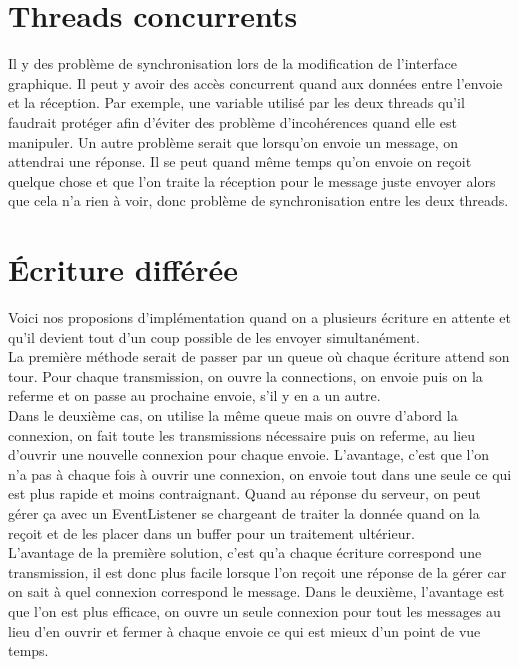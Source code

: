 \documentclass[10pt,a4paper]{article}
\begin{document}
\section{Threads concurrents}
Il y des problème de synchronisation lors de la modification de l'interface graphique. 
Il peut y avoir des accès concurrent quand aux données entre l'envoie et la réception.
Par exemple, une variable utilisé par les deux threads qu'il faudrait protéger afin d'éviter des problème d'incohérences quand elle est manipuler.
Un autre problème serait que lorsqu'on envoie un message, on attendrai une réponse. 
Il se peut quand même temps qu'on envoie on reçoit quelque chose et que l'on traite la réception pour le message juste envoyer alors que cela n'a rien à voir, donc problème de synchronisation entre les deux threads.

\section{Écriture différée}

Voici nos proposions d'implémentation quand on a plusieurs écriture en attente et qu'il devient tout d'un coup possible de les envoyer simultanément. \\

La première méthode serait de passer par un queue où chaque écriture attend son tour.
Pour chaque transmission, on ouvre la connections, on envoie puis on la referme et on passe au prochaine envoie, s'il y en a un autre.\\

Dans le deuxième cas, on utilise la même queue mais on ouvre d'abord la connexion, on fait toute les transmissions nécessaire puis on referme, au lieu d'ouvrir une nouvelle connexion pour chaque envoie. L'avantage, c'est que l'on n'a pas à chaque fois à ouvrir une connexion, on envoie tout dans une seule ce qui est plus rapide et moins contraignant. Quand au réponse du serveur, on peut gérer ça avec un EventListener se chargeant de traiter la donnée quand on la reçoit et de les placer dans un buffer pour un traitement ultérieur.\\

L'avantage de la première solution, c'est qu'a chaque écriture correspond une transmission, il est donc plus facile lorsque l'on reçoit une réponse de la gérer car on sait à quel connexion correspond le message. Dans le deuxième, l'avantage est que l'on est plus efficace, on ouvre un seule connexion pour tout les messages au lieu d'en ouvrir et fermer à chaque envoie ce qui est mieux d'un point de vue temps. 
\end{document}
